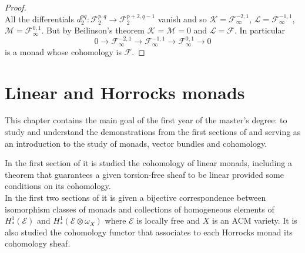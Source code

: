 \documentclass[
	oldfontcommands,
	sumario=abnt-6027-2012,
	12pt,			%
	openright,		%
	oneside,		%
	a4paper,		%
	english,		%
	brazil			%
	]{imecc-unicamp}
\begin{document}
\begin{proof}
 \\
All the differentials $d^{pq}_2 : \mathcal{F}^{p,q}_2 \to \mathcal{F}^{p+2,q-1}_2$ vanish and so  $\mathcal{K}=\mathcal{F}^{-2,1}_\infty$, $\mathcal{L}= \mathcal{F}^{-1,1}_\infty$, $\mathcal{M}=\mathcal{F}^{0,1}_\infty$.
But by Beilinson's theorem $\mathcal{K}=\mathcal{M}=0$ and $\mathcal{L}=\mathcal{F}$. In particular 
\begin{equation}
0 \to \mathcal{F}^{-2,1}_\infty \to \mathcal{F}^{-1,1}_\infty \to \mathcal{F}^{0,1}_\infty \to 0
\end{equation}
is a monad whose cohomology is $\mathcal{F}$.
\end{proof}
\chapter{Linear and Horrocks monads}
This chapter contains the main goal of the first year of the master's degree: to study and understand the demonstrations from the first sections of \cite[Jardim]{jardim} and \cite[Jardim \& Martins]{jardim2} serving as an introduction to the study of monads, vector bundles and cohomology.

In the first section of \cite[Jardim]{jardim} it is studied the cohomology of linear monads, including a theorem that guarantees a given torsion-free sheaf to be linear provided some conditions on its cohomology.\\
In the first two sections of \cite[Jardim \& Martins]{jardim2} it is given a bijective correspondence between isomorphism classes of monads and collections of homogeneous elements of $H^1_*(\mathcal{E})$ and $H^1_*(\mathcal{E}\otimes\omega_X)$ where $\mathcal{E}$ is locally free and $X$ is an ACM variety. It is also studied the cohomology functor that associates to each Horrocks monad its cohomology sheaf.
\end{document}
